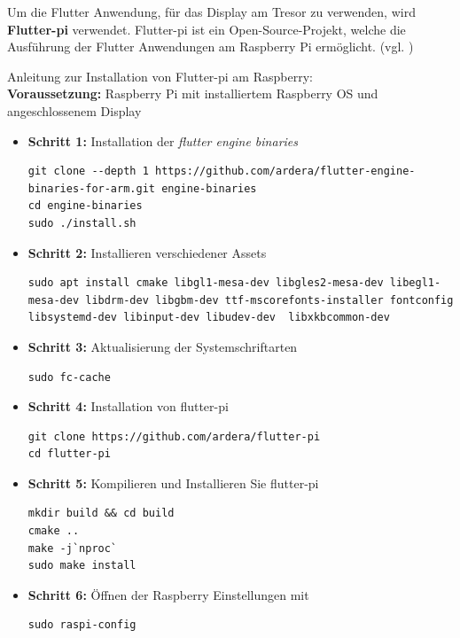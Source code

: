 Um die Flutter Anwendung, für das Display am Tresor zu verwenden, wird {\textbf{Flutter-pi}} verwendet. Flutter-pi ist ein Open-Source-Projekt, welche die Ausführung der Flutter Anwendungen am Raspberry Pi ermöglicht. (vgl. \cite{Flutter-Pi})

Anleitung zur Installation von Flutter-pi am Raspberry:\\
{\textbf{Voraussetzung:}} Raspberry Pi mit installiertem Raspberry OS und angeschlossenem Display

\newpage

\begin{itemize}
    \item {\textbf{Schritt 1:}} Installation der {\textit{flutter engine binaries}} 
    \begin{lstlisting}[style=flutterListingStyle, caption=Installation flutter engine binaries]
git clone --depth 1 https://github.com/ardera/flutter-engine-binaries-for-arm.git engine-binaries
cd engine-binaries
sudo ./install.sh
\end{lstlisting}
\item {\textbf{Schritt 2:}} Installieren verschiedener Assets
    \begin{lstlisting}[style=flutterListingStyle, caption=Installation Bibliotheken]
sudo apt install cmake libgl1-mesa-dev libgles2-mesa-dev libegl1-mesa-dev libdrm-dev libgbm-dev ttf-mscorefonts-installer fontconfig libsystemd-dev libinput-dev libudev-dev  libxkbcommon-dev
\end{lstlisting}
\item {\textbf{Schritt 3:}} Aktualisierung der Systemschriftarten 
\begin{lstlisting}[style=flutterListingStyle, caption=Aktualisierung der Systemschriftarten ]
sudo fc-cache
\end{lstlisting}
\item {\textbf{Schritt 4:}} Installation von flutter-pi
\begin{lstlisting}[style=flutterListingStyle,caption=Installation von flutter-pi]
git clone https://github.com/ardera/flutter-pi
cd flutter-pi
\end{lstlisting}
\item {\textbf{Schritt 5:}} Kompilieren und Installieren Sie flutter-pi 
\begin{lstlisting}[style=flutterListingStyle,caption=Kompilieren flutter-pi]
mkdir build && cd build
cmake ..
make -j`nproc`
sudo make install
\end{lstlisting}
\item {\textbf{Schritt 6:}}  Öffnen der Raspberry Einstellungen mit
\begin{lstlisting}[style=flutterListingStyle,caption=Einstellungen Raspberry]
sudo raspi-config
\end{lstlisting}


\end{itemize}
